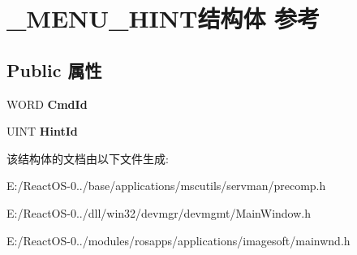 \hypertarget{struct___m_e_n_u___h_i_n_t}{}\section{\+\_\+\+M\+E\+N\+U\+\_\+\+H\+I\+N\+T结构体 参考}
\label{struct___m_e_n_u___h_i_n_t}
\subsection*{Public 属性}
\begin{DoxyCompactItemize}
\item 
\mbox{\label{struct___m_e_n_u___h_i_n_t_a6bd242da345ce3038c19a723e5098a35}} 
W\+O\+RD {\bfseries Cmd\+Id}
\item 
\mbox{\label{struct___m_e_n_u___h_i_n_t_a2f1cf96d2c355ddfc02b8bbd2683c313}} 
U\+I\+NT {\bfseries Hint\+Id}
\end{DoxyCompactItemize}


该结构体的文档由以下文件生成\+:\begin{DoxyCompactItemize}
\item 
E\+:/\+React\+O\+S-\/0../base/applications/mscutils/servman/precomp.\+h\item 
E\+:/\+React\+O\+S-\/0../dll/win32/devmgr/devmgmt/Main\+Window.\+h\item 
E\+:/\+React\+O\+S-\/0../modules/rosapps/applications/imagesoft/mainwnd.\+h\end{DoxyCompactItemize}
